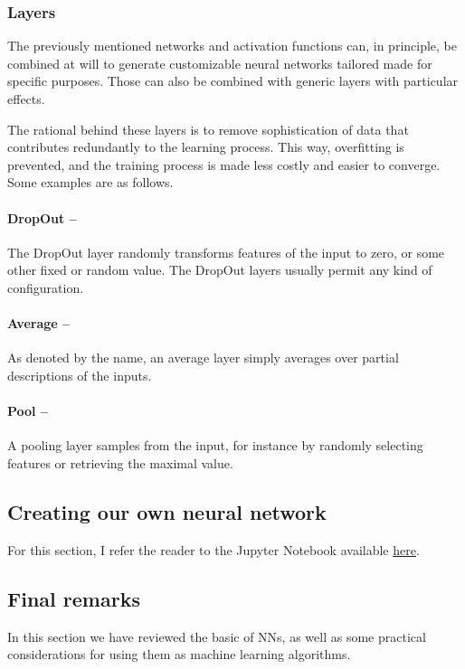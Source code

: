 \documentclass[]{report}
\begin{document}
\subsubsection{Layers}

The previously mentioned networks and activation functions can, in principle, be combined at will to generate customizable neural networks tailored made for specific purposes. Those can also be combined with generic layers with particular effects. 

The rational behind these layers is to remove sophistication of data that contributes redundantly to the learning process. This way, overfitting is prevented, and the training process  is made less costly and easier to converge. Some examples are as follows. 

\paragraph{DropOut --}
The DropOut layer randomly transforms features of the input to zero, or some other fixed or random value. The DropOut layers usually permit any kind of configuration. 


\paragraph{Average --} As denoted by the name, an average layer simply averages over partial descriptions of the inputs. 

\paragraph{Pool -- }A pooling layer samples from the input, for instance by randomly selecting features or retrieving the maximal value. 


\subsection{Creating our own neural network}

For this section, I refer the reader to the Jupyter Notebook available \href{}{here}.

\subsection{Final remarks}

In this section we have reviewed the basic of NNs, as well as some practical considerations for using them as machine learning algorithms. 
\end{document}
